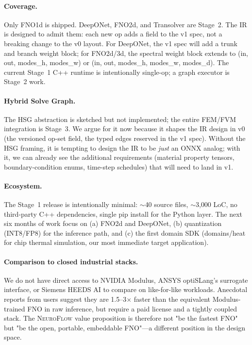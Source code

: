 \documentclass[10pt,twocolumn]{article}
\renewcommand{\texttt}[1]{{\normalfont\ttfamily #1}\normalfont\rmfamily}
\newcommand{\nf}{\textsc{NeuroFlow}}
\begin{document}
\paragraph{Coverage.}
Only FNO1d is shipped.  DeepONet, FNO2d, and Transolver are
Stage~2.  The IR is designed to admit them: each new op adds a
field to the v1 spec, not a breaking change to the v0 layout.
For DeepONet, the v1 spec will add a \texttt{trunk} and
\texttt{branch} weight block; for FNO2d/3d, the spectral
weight block extends to \texttt{(in, out, modes\_h, modes\_w)}
or \texttt{(in, out, modes\_h, modes\_w, modes\_d)}.  The
current Stage~1 C{++} runtime is intentionally single-op; a
graph executor is Stage~2 work.

\paragraph{Hybrid Solve Graph.}
The HSG abstraction is sketched but not implemented; the entire
FEM/FVM integration is Stage~3.  We argue for it now because it
shapes the IR design in v0 (the versioned op-set field, the
typed edges reserved in the v1 spec).  Without the HSG framing,
it is tempting to design the IR to be \emph{just} an ONNX
analog; with it, we can already see the additional requirements
(material property tensors, boundary-condition enums, time-step
schedules) that will need to land in v1.

\paragraph{Ecosystem.}
The Stage~1 release is intentionally minimal: $\sim$40 source
files, $\sim$3{,}000 LoC, no third-party C{++} dependencies,
single \texttt{pip install} for the Python layer.  The next six
months of work focus on (a) FNO2d and DeepONet, (b)
quantization (INT8/FP8) for the inference path, and (c) the
first domain SDK (\texttt{domains/heat} for chip thermal
simulation, our most immediate target application).

\paragraph{Comparison to closed industrial stacks.}
We do not have direct access to NVIDIA Modulus, ANSYS
optiSLang's surrogate interface, or Siemens HEEDS AI to compare
on like-for-like workloads.  Anecdotal reports from users
suggest they are 1.5--3$\times$ faster than the equivalent
Modulus-trained FNO in raw inference, but require a paid
license and a tightly coupled stack.  The \nf{} value
proposition is therefore not "be the fastest FNO" but
"be the open, portable, embeddable FNO"---a different
position in the design space.
\end{document}
